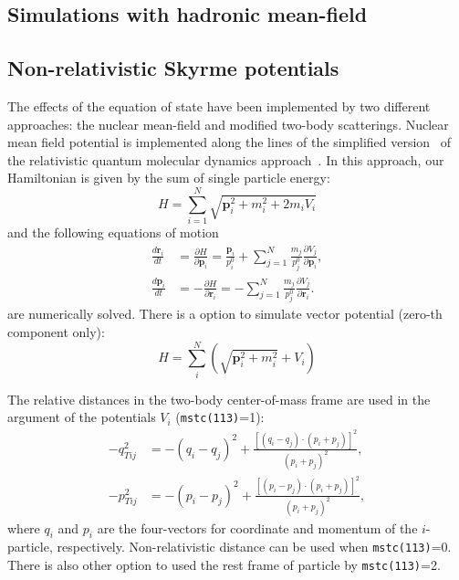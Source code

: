 \documentclass[]{article}
\newcommand{\ttt}[1]{{\tt#1}}
\begin{document}
\subsection{Simulations with hadronic mean-field} \label{sec:mf}

\subsection{Non-relativistic Skyrme potentials}

The effects of the equation of state
have been implemented by two different approaches:
the nuclear mean-field and modified two-body scatterings.
Nuclear mean field potential is implemented along the lines of
the simplified version~\cite{Maruyama:1996rn,Mancusi:2009zz} of
the relativistic quantum molecular dynamics approach~\cite{RQMD}.
In this approach, our Hamiltonian is given by the sum of
single particle energy:
\begin{equation}
 H =\sum_{i=1}^{N}\sqrt{\bm{p}^2_i + m_i^2 + 2m_iV_i}
\end{equation}
and the following equations of motion
\begin{align}
  \frac{d\bm{r}_i}{dt} &= \frac{\partial H}{\partial\bm{p}_i}
   =\frac{\bm{p}_i}{p^0_i}
   + \sum_{j=1}^N\frac{m_j}{p^0_j}
      \frac{\partial V_j}{\partial\bm{p}_i},\nonumber\\
  \frac{d\bm{p}_i}{dt} &= -\frac{\partial H}{\partial\bm{r}_i}
   = -\sum_{j=1}^N\frac{m_j}{p^0_j}
      \frac{\partial V_j}{\partial\bm{r}_i}.
\end{align}
are numerically solved.
There is a option to simulate vector potential (zero-th component only):
\begin{equation}
 H = \sum_i^N \left(\sqrt{\bm{p}_i^2 +m_i^2} + V_i\right)
\end{equation}

The relative distances in the two-body center-of-mass frame
are used in the argument of the potentials $V_i$ (\ttt{mstc(113)}=1):
\begin{align}
 -q_{Tij}^2 &= -(q_{i}-q_j)^2
    + \frac{[(q_i-q_j)\cdot (p_i+p_j)]^2}{(p_i+p_j)^2},\\
 -p_{Tij}^2 &= -(p_{i}-p_j)^2
    + \frac{[(p_i-p_j)\cdot (p_i+p_j)]^2}{(p_i+p_j)^2},
\end{align}
where $q_i$ and $p_i$ are the four-vectors for coordinate and momentum of the
$i$-particle, respectively.
Non-relativistic distance can be used when \ttt{mstc(113)}=0.
There is also other option to used the rest frame of particle by
\ttt{mstc(113)}=2.
\end{document}
